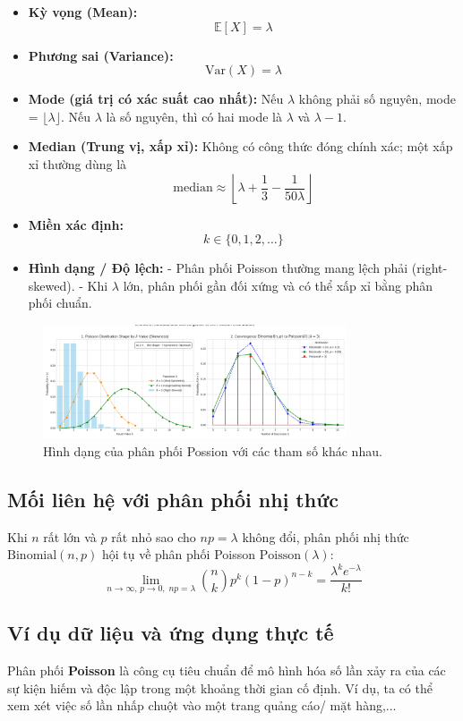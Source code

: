 \begin{itemize}
  \item \textbf{Kỳ vọng (Mean):}  
  \[
    \mathbb{E}[X] = \lambda
  \]
  \item \textbf{Phương sai (Variance):}  
  \[
    \mathrm{Var}(X) = \lambda
  \]
  \item \textbf{Mode (giá trị có xác suất cao nhất):}  
  Nếu $\lambda$ không phải số nguyên, mode = $\lfloor \lambda \rfloor$.  
  Nếu $\lambda$ là số nguyên, thì có hai mode là $\lambda$ và $\lambda - 1$. 
  \item \textbf{Median (Trung vị, xấp xỉ):}  
  Không có công thức đóng chính xác; một xấp xỉ thường dùng là  
  \[
    \mathrm{median} \approx \left\lfloor \lambda + \frac{1}{3} - \frac{1}{50\lambda} \right\rfloor
  \] 
  \item \textbf{Miền xác định:}  
  \[
    k \in \{0, 1, 2, \dots\}
  \]
  \item \textbf{Hình dạng / Độ lệch:}  
  - Phân phối Poisson thường mang lệch phải (right-skewed).  
  - Khi $\lambda$ lớn, phân phối gần đối xứng và có thể xấp xỉ 
  bằng phân phối chuẩn.   
\end{itemize}
\begin{figure}[h!]
    \centering
    \includegraphics[width=0.8\textwidth]{images/Poisson_Shape_and_Binomial_Convergence.png}
    \caption{Hình dạng của phân phối Possion với các tham số khác nhau.}
    \label{fig:poisson_dist}
\end{figure}
\subsection{Mối liên hệ với phân phối nhị thức}


Khi $n$ rất lớn và $p$ rất nhỏ sao cho $np = \lambda$ không đổi, phân phối nhị thức $\mathrm{Binomial}(n, p)$ hội tụ về phân phối Poisson $\mathrm{Poisson}(\lambda)$:  
\[
\lim_{n \to \infty,\, p \to 0,\; np = \lambda} \binom{n}{k} p^k (1 - p)^{n-k} = \frac{\lambda^k e^{-\lambda}}{k!}
\]

\subsection*{Ví dụ dữ liệu và ứng dụng thực tế }
Phân phối \textbf{Poisson} là công cụ tiêu chuẩn để mô hình hóa 
số lần xảy ra của các sự kiện hiếm và độc lập trong một khoảng thời gian cố định.
Ví dụ, ta có thể xem xét việc số lần nhấp chuột vào một trang quảng cáo/ mặt hàng,...

